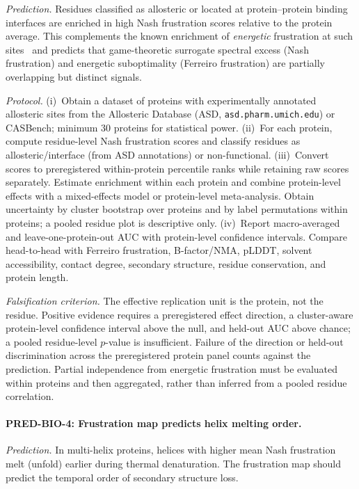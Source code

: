 \documentclass[12pt,a4paper]{article}
\theoremstyle{remark}
\begin{document}
\textit{Prediction.}
Residues classified as allosteric or located at protein--protein binding interfaces are enriched in high Nash frustration scores relative to the protein average. This complements the known enrichment of \emph{energetic} frustration at such sites~\citep{Ferreiro2014} and predicts that game-theoretic surrogate spectral excess (Nash frustration) and energetic suboptimality (Ferreiro frustration) are partially overlapping but distinct signals.

\textit{Protocol.}
(i)~Obtain a dataset of proteins with experimentally annotated allosteric sites from the Allosteric Database (ASD, \texttt{asd.pharm.umich.edu}) or CASBench; minimum 30 proteins for statistical power.
(ii)~For each protein, compute residue-level Nash frustration scores and classify residues as allosteric/interface (from ASD annotations) or non-functional.
(iii)~Convert scores to preregistered within-protein percentile ranks while retaining raw scores separately. Estimate enrichment within each protein and combine protein-level effects with a mixed-effects model or protein-level meta-analysis. Obtain uncertainty by cluster bootstrap over proteins and by label permutations within proteins; a pooled residue plot is descriptive only.
(iv)~Report macro-averaged and leave-one-protein-out AUC with protein-level confidence intervals. Compare head-to-head with Ferreiro frustration, B-factor/NMA, pLDDT, solvent accessibility, contact degree, secondary structure, residue conservation, and protein length.

\textit{Falsification criterion.}
The effective replication unit is the protein, not the residue. Positive evidence requires a preregistered effect direction, a cluster-aware protein-level confidence interval above the null, and held-out AUC above chance; a pooled residue-level $p$-value is insufficient. Failure of the direction or held-out discrimination across the preregistered protein panel counts against the prediction. Partial independence from energetic frustration must be evaluated within proteins and then aggregated, rather than inferred from a pooled residue correlation.

\paragraph{PRED-BIO-4: Frustration map predicts helix melting order.}

\textit{Prediction.}
In multi-helix proteins, helices with higher mean Nash frustration melt (unfold) earlier during thermal denaturation. The frustration map should predict the temporal order of secondary structure loss.
\end{document}
